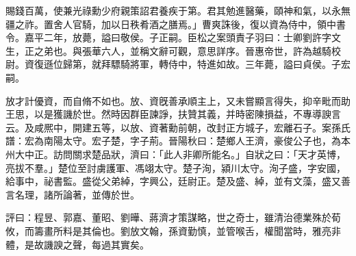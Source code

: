 \begin{pinyinscope}
賜錢百萬，使兼光祿勳少府親策詔君養疾于第。君其勉進醫藥，頤神和氣，以永無疆之祚。置舍人官騎，加以日秩肴酒之膳焉。」曹爽誅後，復以資為侍中，領中書令。嘉平二年，放薨，謚曰敬侯。子正嗣。臣松之案頭責子羽曰：士卿劉許字文生，正之弟也。與張華六人，並稱文辭可觀，意思詳序。晉惠帝世，許為越騎校尉。資復遜位歸第，就拜驃騎將軍，轉侍中，特進如故。三年薨，謚曰貞侯。子宏嗣。

放才計優資，而自脩不如也。放、資旣善承順主上，又未嘗顯言得失，抑辛毗而助王思，以是獲譏於世。然時因群臣諫諍，扶贊其義，并時密陳損益，不專導諛言云。及咸熈中，開建五等，以放、資著勳前朝，改封正方城子，宏離石子。案孫氏譜：宏為南陽太守。宏子楚，字子荊。晉陽秋曰：楚鄉人王濟，豪俊公子也，為本州大中正。訪問關求楚品狀，濟曰：「此人非卿所能名。」自狀之曰：「天才英博，亮拔不羣。」楚位至討虜護軍、馮翊太守。楚子洵，潁川太守。洵子盛，字安國，給事中，祕書監。盛從父弟綽，字興公，廷尉正。楚及盛、綽，並有文藻，盛又善言名理，諸所論著，並傳於世。

評曰：程昱、郭嘉、董昭、劉曄、蔣濟才策謀略，世之奇士，雖清治德業殊於荀攸，而籌畫所料是其倫也。劉放文翰，孫資勤慎，並管喉舌，權聞當時，雅亮非體，是故譏諛之聲，每過其實矣。


\end{pinyinscope}
